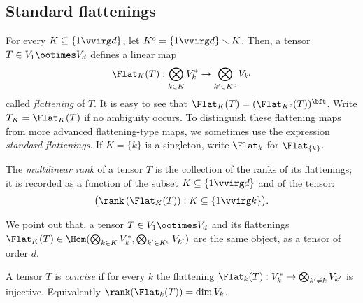 \subsection{Standard flattenings}
\label{preliminaries-subsection-flattenings}
\begin{definition}
\label{introduction-definition-flattenings}
For every $K \subseteq \{1 \vvirg d\}$, let $K^c = \{1\vvirg d\} \smallsetminus K$. Then, a tensor $T \in V_1 \ootimes V_d$ defines a linear map 
\[
    \Flat_K(T): \bigotimes_{k \in K} V_{k}^* \to  \bigotimes_{k' \in K^c} V_{k'}
\]
called \emph{flattening} of $T$. It is easy to see that $\Flat_K(T) = (\Flat_{K^c}(T))^\bft$. Write $T_K = \Flat_{K}(T)$ if no ambiguity occurs. To distinguish these flattening maps from more advanced flattening-type maps, we sometimes use the expression \emph{standard flattenings}. If $K = \{k\}$ is a singleton, write $\Flat_k$ for $\Flat_{\{k\}}$.

The {\it multilinear rank} of a tensor $T$ is the collection of the ranks of its flattenings; it is recorded as a function of the subset $K \subseteq \{ 1 \vvirg d\}$ and of the tensor:
\[
\bigl( \rank \left( \Flat_K(T) \right) : K \subseteq \{1 \vvirg k\} \bigr).
\]
\end{definition}
We point out that, a tensor $T \in V_1 \ootimes V_d$ and its flattenings $\Flat_K(T) \in \Hom ( \bigotimes_{k \in K} V_{k}^*,\bigotimes_{k' \in K^c} V_{k'})$ are the same object, as a tensor of order $d$. 

\begin{definition}
\label{introduction-definition-concise}
A tensor $T$ is \emph{concise} if for every $k$ the flattening $\Flat_k(T) : V_k^* \to \bigotimes_{k' \neq k} V_{k'}$ is injective. Equivalently $\rank(\Flat_k(T)) = \dim V_k$.
\end{definition}

